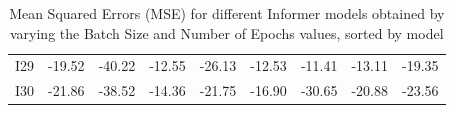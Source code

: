 \begin{table}[]
{\begin{tabular}{ccccccccc}
    I29   & \cellcolor[HTML]{FDC27D}-19.52 & \cellcolor[HTML]{63BE7B}-40.22 & \cellcolor[HTML]{FCB079}-12.55 & \cellcolor[HTML]{C2D980}-26.13 & \cellcolor[HTML]{FDC07C}-12.53 & \cellcolor[HTML]{FB9F76}-11.41 & \cellcolor[HTML]{FCB37A}-13.11 & \cellcolor[HTML]{EFE683}-19.35 \\
    I30   & \cellcolor[HTML]{DBE081}-21.86 & \cellcolor[HTML]{AAD27F}-38.52 & \cellcolor[HTML]{63BE7B}-14.36 & \cellcolor[HTML]{FED780}-21.75 & \cellcolor[HTML]{63BE7B}-16.90 & \cellcolor[HTML]{63BE7B}-30.65 & \cellcolor[HTML]{63BE7B}-20.88 & \cellcolor[HTML]{63BE7B}-23.56
    \end{tabular}%
    }
    \caption{Mean Squared Errors (MSE) for different Informer models obtained by varying the Batch Size and Number of Epochs values, sorted by model}
    \label{I5_M}
    \end{table}


